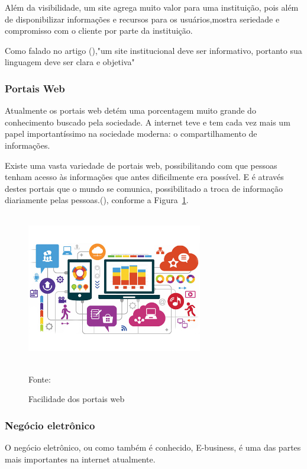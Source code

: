 Além da visibilidade, um site agrega muito valor para uma instituição, pois além de disponibilizar informações e recursos para os usuários,mostra seriedade e compromisso com o cliente por parte da instituição.

Como falado no artigo (\cite{institucional}),"um site institucional deve ser informativo, portanto sua linguagem deve ser clara e objetiva"

\subsubsection{Portais Web}

Atualmente os portais web detém uma porcentagem muito grande do conhecimento buscado pela sociedade. A internet teve e tem cada vez mais um papel importantíssimo na sociedade moderna: o compartilhamento de informações.

Existe uma vasta variedade de portais web, possibilitando com que pessoas tenham acesso às informações que antes dificilmente era possível.
\newpage
E é através destes portais que o mundo se comunica, possibilitado a troca de informação diariamente pelas pessoas.(\cite{portal-web}), conforme a Figura~\hypersetup{linkcolor=black}\ref{fig:Facilidade}.

 \begin{figure}[!h]
	\centering
	\caption{Facilidade dos portais web}
	\label{fig:Facilidade}
	\includegraphics[width=290px, height=250px]{./images/2-5.png}
	\par{Fonte: \cite{newtechs}}
\end{figure}

\subsubsection{Negócio eletrônico}

O negócio eletrônico, ou como também é conhecido, E-business, é uma das partes mais importantes na internet atualmente.

